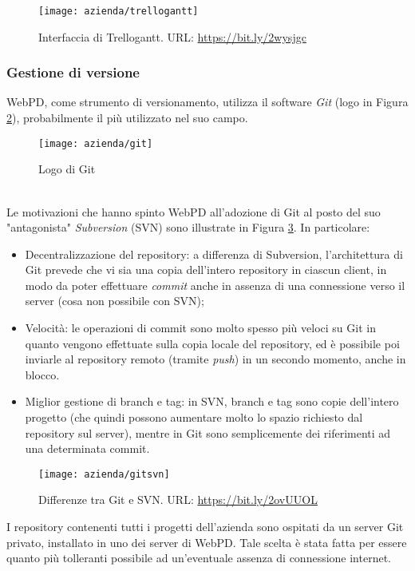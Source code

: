 \begin{figure}[!h] 
	\centering 
	\texttt{[image: azienda/trellogantt]} 
	\caption{Interfaccia di Trellogantt. URL: \url{https://bit.ly/2wysjgc} }
	\label{figura:trellogantt}
\end{figure}


\subsubsection{Gestione di versione}
WebPD, come strumento di versionamento, utilizza il software \textit{Git} (logo in Figura \ref{figura:logo-git}), probabilmente il più utilizzato nel suo campo.\\
\begin{figure}[!h] 
	\centering 
	\texttt{[image: azienda/git]} 
	\caption{Logo di Git }
	\label{figura:logo-git}
\end{figure}\\
 Le motivazioni che hanno spinto WebPD all'adozione di Git al posto del suo "antagonista" \textit{Subversion} (SVN) sono illustrate in Figura \ref{figura:differenze-git-svn}. In particolare\cite{site:svnvsgit}:
\begin{itemize}
	\item Decentralizzazione del repository: a differenza di Subversion, l'architettura di Git prevede che vi sia una copia dell'intero repository in ciascun client, in modo da poter effettuare \textit{commit} anche in assenza di una connessione verso il server (cosa non possibile con SVN);
	\item Velocità: le operazioni di commit sono molto spesso più veloci su Git in quanto vengono effettuate sulla copia locale del repository, ed è possibile poi inviarle al repository remoto (tramite \textit{push}) in un secondo momento, anche in blocco.
	\item Miglior gestione di branch e tag: in SVN, branch e tag sono copie dell'intero progetto (che quindi possono aumentare molto lo spazio richiesto dal repository sul server), mentre in Git sono semplicemente dei riferimenti ad una determinata commit.
\end{itemize}
\begin{figure}[!h] 
	\centering 
	\texttt{[image: azienda/gitsvn]} 
	\caption{Differenze tra Git e SVN. URL: \url{https://bit.ly/2ovUUOL} }
	\label{figura:differenze-git-svn}
\end{figure}
I repository contenenti tutti i progetti dell'azienda sono ospitati da un server Git privato, installato in uno dei server di WebPD. Tale scelta è stata fatta per essere quanto più tolleranti possibile ad un'eventuale assenza di connessione internet.

